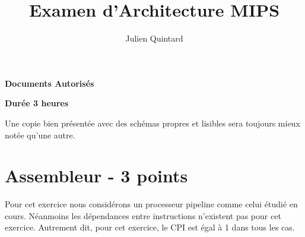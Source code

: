 %
%
%
%
%
%

%
%

\def\path{../../../..}

%
%



%
%


%
%

\title{Examen d'Architecture MIPS}

%
%

\author{\small{Julien Quintard}}

%
%



%
%

\maketitle

%
%

\begin{center}

\textbf{Documents Autoris\'es}

\textbf{Dur\'ee 3 heures}

\scriptsize{Une copie bien pr\'esent\'ee avec des sch\'emas propres et
	    lisibles sera toujours mieux not\'ee qu'une autre.}
\end{center}

%
%

%
%

\section{Assembleur - 3 points}

Pour cet exercice nous consid\'erons un processeur pipeline comme celui
\'etudi\'e en cours. N\'eanmoins les d\'ependances entre instructions
n'existent pas pour cet exercice. Autrement dit, pour cet exercice,
le CPI est \'egal \`a 1 dans tous les cas.

